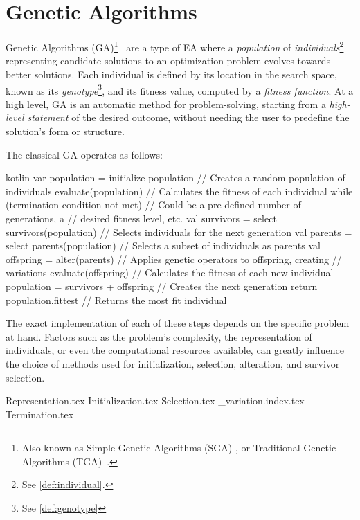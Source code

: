 \section{Genetic Algorithms}
\label{sec:bg:ga}
  Genetic Algorithms (GA)\footnote{
    Also known as Simple Genetic Algorithms (SGA) 
    \autocite{yuIntroductionEvolutionaryAlgorithms2010}, or Traditional 
    Genetic Algorithms (TGA)~\autocite{shiffmanNatureCode2012}.
  }~\autocite{hollandAdaptationNaturalArtificial1992a,kozaGeneticProgrammingProgramming1992a,yuIntroductionEvolutionaryAlgorithms2010,shiffmanNatureCode2012}
  are a type of EA where a \emph{population} of \emph{individuals}\footnote{
    See \vref{def:individual}.
  } representing candidate solutions to an optimization problem evolves towards 
  better solutions.
  Each individual is defined by its location in the search space, known as its
  \emph{genotype}\footnote{See \vref{def:genotype}}, and its fitness value, 
  computed by a \emph{fitness function}.
  At a high level, GA is an automatic method for problem-solving, starting from
  a \textit{high-level statement} of the desired outcome, without needing the
  user to predefine the solution's form or structure.

  The classical GA operates as follows:

  \begin{code}{kotlin}
    var population = initialize population // Creates a random population of individuals
    evaluate(population) // Calculates the fitness of each individual
    while (termination condition not met) { // Could be a pre-defined number of generations, a 
                                            // desired fitness level, etc.
      val survivors = select survivors(population) // Selects individuals for the next generation
      val parents = select parents(population) // Selects a subset of individuals as parents
      val offspring = alter(parents)  // Applies genetic operators to offspring, creating 
                                      // variations
      evaluate(offspring) // Calculates the fitness of each new individual
      population = survivors + offspring // Creates the next generation
    }
    return population.fittest // Returns the most fit individual
  \end{code}

  The exact implementation of each of these steps depends on the specific problem at hand. Factors such as the problem's complexity, the representation of individuals, or even the computational resources available, can greatly influence the choice of methods used for initialization, selection, alteration, and survivor selection.

  {Representation.tex}
  {Initialization.tex}
  {Selection.tex}
  {_variation.index.tex}
  {Termination.tex}
